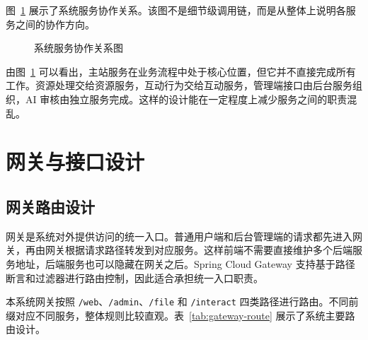 图~\ref{fig:service-collaboration} 展示了系统服务协作关系。该图不是细节级调用链，而是从整体上说明各服务之间的协作方向。

\begin{figure}[htbp]
  \centering
  \caption{系统服务协作关系图}
  \label{fig:service-collaboration}
\end{figure}

由图~\ref{fig:service-collaboration} 可以看出，主站服务在业务流程中处于核心位置，但它并不直接完成所有工作。资源处理交给资源服务，互动行为交给互动服务，管理端接口由后台服务组织，AI 审核由独立服务完成。这样的设计能在一定程度上减少服务之间的职责混乱。

\section{网关与接口设计}
\label{sec:gateway-interface-design}

\subsection{网关路由设计}
\label{subsec:gateway-route-design}

网关是系统对外提供访问的统一入口。普通用户端和后台管理端的请求都先进入网关，再由网关根据请求路径转发到对应服务。这样前端不需要直接维护多个后端服务地址，后端服务也可以隐藏在网关之后。Spring Cloud Gateway 支持基于路径断言和过滤器进行路由控制，因此适合承担统一入口职责\cite{springgatewaydocs}。

本系统网关按照 \texttt{/web}、\texttt{/admin}、\texttt{/file} 和 \texttt{/interact} 四类路径进行路由。不同前缀对应不同服务，整体规则比较直观。表~\ref{tab:gateway-route} 展示了系统主要路由设计。

